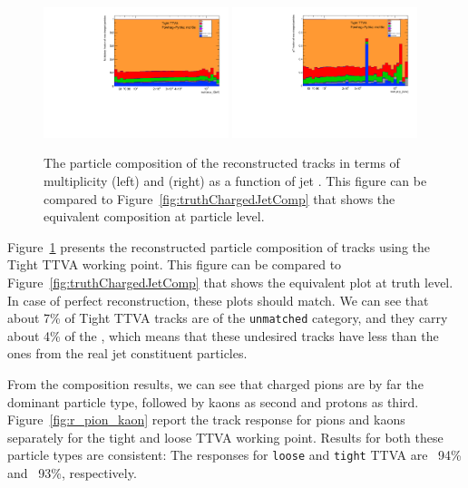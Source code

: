 \begin{figure}[b]
\centering
\includegraphics[width=0.48\textwidth,page=1]{figures/jetcompstudy_MultiplicityFraction.pdf}
\includegraphics[width=0.48\textwidth,page=1]{figures/jet_comp_study_powheg_Tight_pTFraction_mc16e.pdf}%
\caption {The particle composition of the reconstructed tracks in terms of multiplicity (left) and \pT (right) as a function of jet \pt{}. 
This figure can be compared to Figure~\ref{fig:truthChargedJetComp} that shows the equivalent composition at particle level.}
\label{fig:trackParticleComp}
\end{figure}

Figure~\ref{fig:trackParticleComp} presents the reconstructed particle composition of tracks using the Tight TTVA working point. This figure can be compared to Figure~\ref{fig:truthChargedJetComp} that shows the equivalent plot at truth level. In case of perfect reconstruction, these plots should match.
We can see that about 7\% of Tight TTVA tracks are of the \texttt{unmatched} category, and they carry about 4\% of the \pt{}, which means that these undesired tracks have less \pt{} than the ones from the real jet constituent particles.

From the composition results, we can see that charged pions are by far the dominant particle type, followed by kaons as second and protons as third.
Figure~\ref{fig:r_pion_kaon} report the track \pt{} response for pions and kaons separately for the tight and loose TTVA working point. 
Results for both these particle types are consistent: The responses for \texttt{loose} and \texttt{tight} TTVA are ~94\% and ~93\%, respectively.

